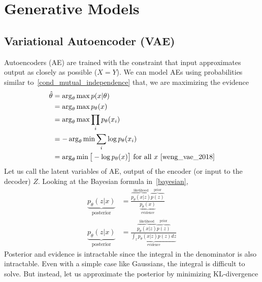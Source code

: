 \documentclass{book}
\numberwithin{equation}{subsection}
\begin{document}
\chapter{Generative Models}
\section{Variational Autoencoder (VAE)}
Autoencoders (AE) are trained with the constraint that input approximates output as closely as possible ($X=Y$). We can model AEs using probabilities similar to~\ref{cond_mutual_independence} that, we are maximizing the evidence
\begin{align}
    \hat{\theta} &= \arg_\theta\max p(x|\theta) \label{max_prob}\\
    &= \arg_\theta\max p_\theta(x) \label{max_prob}\\
    &= \arg_\theta\max\prod_i p_\theta(x_i)\\
    &= -\arg_\theta\min\sum_i \log p_\theta(x_i)\\
    &= \arg_\theta\min\big[-\log p_\theta(x)\big]\ \text{for all $x$}~\cite{weng_vae_2018}
\end{align}
Let us call the latent variables of AE, output of the encoder (or input to the decoder) $Z$. Looking at the Bayesian formula in~\ref{bayesian},
\begin{align}
    \underbrace{p_\theta(z|x)}_{\text{posterior}} &= \frac{\overbrace{p_\theta(x|z)}^\text{likelihood}\overbrace{p(z)}^\text{prior}}{\underbrace{p_\theta(x)}_\text{evidence}}\\
    \underbrace{p_\theta(z|x)}_{\text{posterior}} &= \frac{\overbrace{p_\theta(x|z)}^\text{likelihood}\overbrace{p(z)}^\text{prior}}{\underbrace{\int_z p_\theta(x|z)p(z)dz}_\text{evidence}}
\end{align}
Posterior and evidence is intractable since the integral in the denominator is also intractable. Even with a simple case like Gaussians, the integral is difficult to solve. But instead, let us approximate the posterior by minimizing KL-divergence
\end{document}
